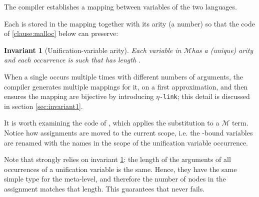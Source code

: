 \documentclass[sigconf,natbib=false,review]{acmart}
\newtheorem{invariant}{Invariant}
\newcommand{\linkMacro}[1]{\ensuremath{#1}\texttt{-link}\xspace}
\newcommand{\linketa} {\linkMacro{\eta}}
\newcommand{\Fo}{\texorpdfstring{\ensuremath{\mathcal{O}}\xspace}{O}}
\newcommand{\Ho}{\texorpdfstring{\ensuremath{\mathcal{M}}\xspace}{M}}
\begin{document}
The compiler establishes a mapping between variables of the two languages.



\noindent
Each  is stored in the mapping together with
its arity (a number) so that the code of \ref{clause:malloc} below can preserve:

\begin{invariant}[Unification-variable arity]\label{inv:uvaarity}
  Each variable 
  in \Ho has a (unique) arity  and each occurrence
   is such that  has length .
\end{invariant}



\noindent
When a single  occurs multiple times with different numbers
of arguments, the compiler generates multiple mappings for it, on a first
approximation, and then ensures the mapping are bijective by introducing
\linketa; this detail is discussed in section \ref{sec:invariant1}.

% 
It is worth examining the code of , which
applies the substitution to a \Ho{} term. Notice how assignments are moved
to the current scope, i.e. the -bound variables are renamed
with the names in the scope of the unification variable occurrence.



\noindent
Note that  strongly relies on invariant \ref{inv:uvaarity}: the length
of the arguments of all occurrences of a unification variable is the same. Hence,
they have the same simple type for the meta-level, and therefore the number of
 nodes in the assignment matches that length.
This guarantees that  never fails.
\end{document}
